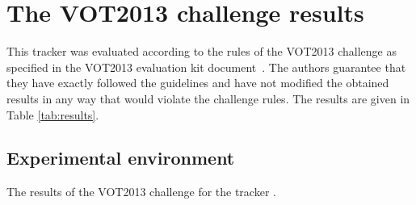 \documentclass[10pt,oneside]{article}
\begin{document}
\section{The VOT2013 challenge results}
This tracker was evaluated according to the rules of the VOT2013 challenge
as specified in the VOT2013 evaluation kit document~\cite{VOT2013}.
The authors guarantee that they have exactly followed the guidelines
and have not modified the obtained results in any way that would violate the challenge rules.
The results are given in Table \ref{tab:results}.

\subsection{Experimental environment}

\begin{table}
  \caption{The results of the VOT2013 challenge for the tracker
    .}
  \label{tab:results}

\end{table}
{\small
  
  
}
\end{document}
